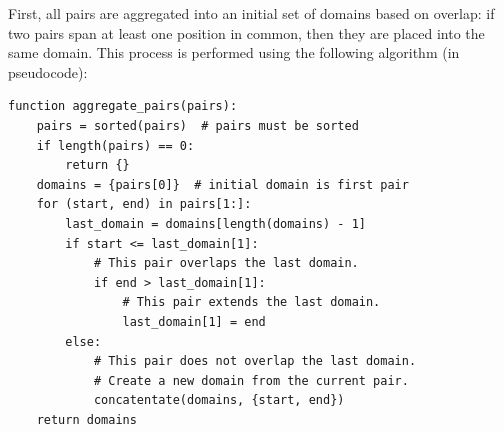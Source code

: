 \documentclass[11pt]{article}
\begin{document}
First, all pairs are aggregated into an initial set of domains based on overlap: if two pairs span at least one position in common, then they are placed into the same domain.
This process is performed using the following algorithm (in pseudocode):
\begin{verbatim}
function aggregate_pairs(pairs):
    pairs = sorted(pairs)  # pairs must be sorted
    if length(pairs) == 0:
        return {}
    domains = {pairs[0]}  # initial domain is first pair
    for (start, end) in pairs[1:]:
        last_domain = domains[length(domains) - 1]
        if start <= last_domain[1]:
            # This pair overlaps the last domain.
            if end > last_domain[1]:
                # This pair extends the last domain.
                last_domain[1] = end
        else:
            # This pair does not overlap the last domain.
            # Create a new domain from the current pair.
            concatentate(domains, {start, end})
    return domains
\end{verbatim}
\end{document}
